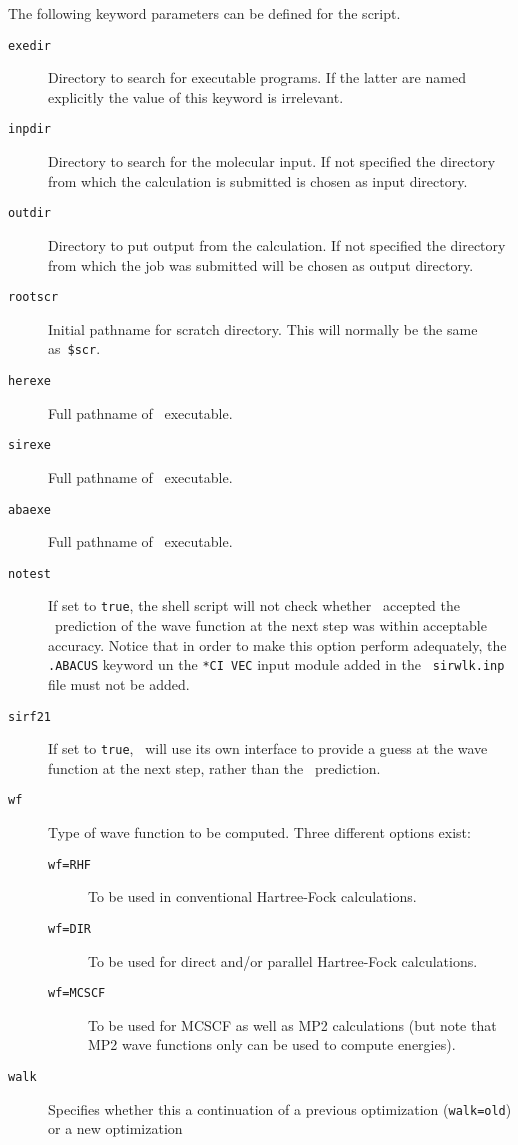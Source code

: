           The following keyword parameters can be defined for the
script.
\begin{description}
\item[\verb|exedir|] Directory to search for executable programs.
If the latter are named explicitly the value of this keyword is
irrelevant.
\item[\verb|inpdir|] Directory to search for the molecular input. If
not specified the directory from which the calculation is submitted is
chosen as input directory.
\item[\verb|outdir|] Directory to put output from the calculation. If
not specified the directory from which the job was submitted will be
chosen as output directory.
\item[\verb|rootscr|] Initial pathname for scratch directory.
This will normally be the same as~\verb|$scr|.
\item[\verb|herexe|] Full pathname of \her\ executable.
\item[\verb|sirexe|] Full pathname of \sir\ executable.
\item[\verb|abaexe|] Full pathname of \aba\ executable.
\item[\verb|notest|] If set to \verb|true|, the shell script will not
check whether \sir\ accepted the  \aba\ prediction of the wave
function at the next step was within acceptable accuracy.  Notice that
in order to  make this option perform adequately, the \verb|.ABACUS|
keyword un the \verb|*CI VEC| input module added in the {\tt
sirwlk.inp} file must not be added.
\item[\verb|sirf21|] If set to \verb|true|, \sir\ will use its own
interface to provide a guess at the wave function at the next
step, rather than the \aba\ prediction.  
\item[\verb|wf    |] Type of wave function to be computed. Three
different options exist:
\begin{description}
\item[\verb|wf=RHF|] To be used in conventional Hartree-Fock
calculations.
\item[\verb|wf=DIR|] To be used for direct and/or parallel
Hartree-Fock calculations.
\item[\verb|wf=MCSCF|] To be used for MCSCF as well as MP2
calculations (but note that MP2 wave functions only can be used to
compute energies).
\end{description}
\item[\verb|walk  |] Specifies whether this a continuation of a
previous optimization (\verb|walk=old|) or a new optimization

\end{description}
